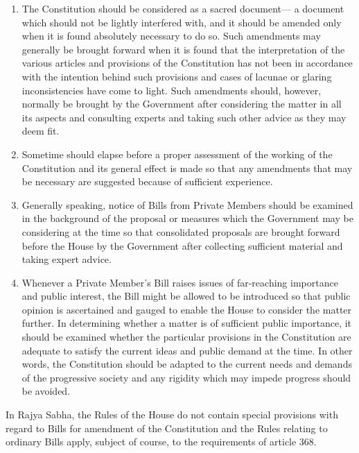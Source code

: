 \begin{multicols}{2}
\begin{enumerate}
\itemsep=0pt
\item The Constitution should be considered as a sacred document— a document which should
not be lightly interfered with, and it should be amended only when it is found absolutely
necessary to do so. Such amendments may generally be brought forward when it is found that
the interpretation of the various articles and provisions of the Constitution has not been in
accordance with the intention behind such provisions and cases of lacunae or glaring inconsistencies have come to light. Such amendments should, however, normally be brought
by the Government after considering the matter in all its aspects and consulting experts and
taking such other advice as they may deem fit.

\item Sometime should elapse before a proper assessment of the working of the Constitution and
its general effect is made so that any amendments that may be necessary are suggested because
of sufficient experience.

\item Generally speaking, notice of Bills from Private Members should be examined in the
background of the proposal or measures which the Government may be considering at the
time so that consolidated proposals are brought forward before the House by the Government
after collecting sufficient material and taking expert advice.

\item Whenever a Private Member’s Bill raises issues of far-reaching importance and public
interest, the Bill might be allowed to be introduced so that public opinion is ascertained and
gauged to enable the House to consider the matter further. In determining whether a matter is
of sufficient public importance, it should be examined whether the particular provisions in the
Constitution are adequate to satisfy the current ideas and public demand at the time. In other
words, the Constitution should be adapted to the current needs and demands of the progressive
society and any rigidity which may impede progress should be avoided.
\end{enumerate}

\vspace{-.3cm}

\noi
In Rajya Sabha, the Rules of the House do not contain special provisions with regard to Bills
for amendment of the Constitution and the Rules relating to ordinary Bills apply, subject of
course, to the requirements of article 368.


\end{multicols}
